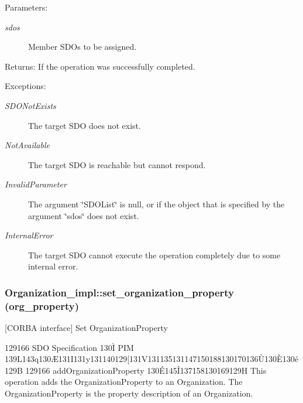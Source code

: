 \begin{Desc}
\item[Parameters:]
\begin{description}
\item[{\em sdos}]Member SDOs to be assigned. \end{description}
\end{Desc}
\begin{Desc}
\item[Returns:]If the operation was successfully completed. \end{Desc}
\begin{Desc}
\item[Exceptions:]
\begin{description}
\item[{\em SDONot\-Exists}]The target SDO does not exist. \item[{\em Not\-Available}]The target SDO is reachable but cannot respond. \item[{\em Invalid\-Parameter}]The argument \char`\"{}SDOList\char`\"{} is null, or if the object that is specified by the argument \char`\"{}sdos\char`\"{} does not exist. \item[{\em Internal\-Error}]The target SDO cannot execute the operation completely due to some internal error.\end{description}
\end{Desc}
\subsubsection{\setlength{\rightskip}{0pt plus 5cm}Organization\_\-impl::set\_\-organization\_\-property (org\_\-property)}\label{classOrganization__impl_Organization__impla3}


[CORBA interface] Set Organization\-Property 

129166 SDO Specification 130\`{I} PIM 139L143q130\AE{}131I131y131140129[131V131135131147150188130170136\`{U}130\`{E}130\'{e}129B 129166 add\-Organization\-Property 130\'{E}145\^{I}137158130169129H This operation adds the Organization\-Property to an Organization. The Organization\-Property is the property description of an Organization.

